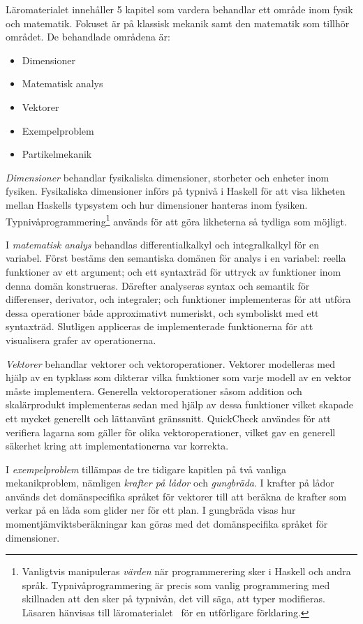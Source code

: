 Läromaterialet innehåller 5 kapitel som vardera behandlar ett område inom fysik och matematik. Fokuset är på klassisk mekanik samt den matematik som tillhör området. De behandlade områdena är:

\begin{itemize}
  \item Dimensioner
  \item Matematisk analys
  \item Vektorer
  \item Exempelproblem
  \item Partikelmekanik
\end{itemize}

\textit{Dimensioner} behandlar fysikaliska dimensioner, storheter och enheter inom fysiken.
Fysikaliska dimensioner införs på typnivå i Haskell för att visa likheten mellan
Haskells typsystem och hur dimensioner hanteras inom fysiken.
Typnivåprogrammering\footnote{Vanligtvis manipuleras \textit{värden} när
programmerering sker i Haskell och andra språk. Typnivåprogrammering är precis som
vanlig programmering med skillnaden att den sker på typnivån, det vill säga, att
typer modifieras. Läsaren hänvisas till läromaterialet~\cite{LYAP} för en utförligare
förklaring.} används för att göra likheterna så tydliga som möjligt.

I \textit{matematisk analys} behandlas differentialkalkyl och
integralkalkyl för en variabel. Först bestäms den semantiska domänen
för analys i en variabel: reella funktioner av ett argument; och ett syntaxträd
för uttryck av funktioner inom denna domän konstrueras. Därefter
analyseras syntax och semantik för differenser, derivator, och
integraler; och funktioner implementeras för att utföra dessa
operationer både approximativt numeriskt, och symboliskt med ett
syntaxträd. Slutligen appliceras de implementerade funktionerna för
att visualisera grafer av operationerna.

\textit{Vektorer} behandlar vektorer och vektoroperationer. Vektorer modelleras
med hjälp av en typklass som dikterar vilka funktioner som varje
modell av en vektor måste implementera. Generella vektoroperationer såsom
addition och skalärprodukt implementeras sedan med hjälp av dessa funktioner
vilket skapade ett mycket generellt och lättanvänt gränssnitt. QuickCheck
användes för att verifiera lagarna som gäller för olika vektoroperationer,
vilket gav en generell säkerhet kring att implementationerna var korrekta.

I \textit{exempelproblem} tillämpas de tre tidigare kapitlen på två vanliga
mekanikproblem, nämligen \textit{krafter på lådor} och \textit{gungbräda}. I
krafter på lådor används det domänspecifika språket för vektorer till att
beräkna de krafter som verkar på en låda som glider ner för ett plan. I
gungbräda visas hur momentjämviktsberäkningar kan göras med det domänspecifika
språket för dimensioner. 


